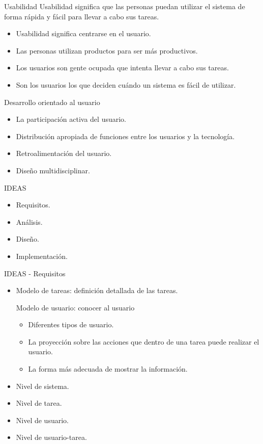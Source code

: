 \documentclass{beamer}
\begin{document}
\begin{frame}{Usabilidad}
 Usabilidad significa que las personas puedan utilizar el sistema de forma rápida y fácil para llevar a cabo sus tareas.
  \begin{itemize}
   \item Usabilidad significa centrarse en el usuario.
   \item Las personas utilizan productos para ser más productivos.
   \item Los usuarios son gente ocupada que intenta llevar a cabo sus tareas.
   \item Son los usuarios los que deciden cuándo un sistema es fácil de utilizar.
  \end{itemize}
\end{frame}

 


\begin{frame}{Desarrollo orientado al usuario}
  \begin{itemize}
   \item La participación activa del usuario.
   \item Distribución apropiada de funciones entre los usuarios y la tecnología.
   \item Retroalimentación del usuario.
   \item Diseño multidisciplinar.
  \end{itemize}
\end{frame}

\begin{frame}{IDEAS}
  \begin{itemize}
   \item Requisitos.
   \item Análisis.
   \item Diseño.
   \item Implementación.
  \end{itemize}
\end{frame}

\begin{frame}{IDEAS - Requisitos}
 \begin{itemize}
  \item Modelo de tareas: definición detallada de las tareas.
  \begin{block}{Modelo de usuario: conocer al usuario}
   \begin{itemize}
    \item Diferentes tipos de usuario.
    \item La proyección sobre las acciones que dentro de una tarea puede realizar el usuario.
    \item La forma más adecuada de mostrar la información.
   \end{itemize}
  \end{block}
  \item Nivel de sistema.
  \item Nivel de tarea.
  \item Nivel de usuario.
  \item Nivel de usuario-tarea.
 \end{itemize}
\end{frame}
\end{document}
